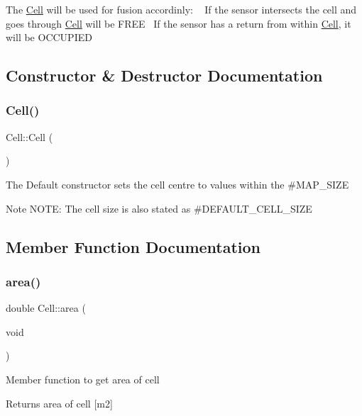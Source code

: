 The \hyperlink{classCell}{Cell} will be used for fusion accordinly\+: ~\newline
If the sensor intersects the cell and goes through \hyperlink{classCell}{Cell} will be F\+R\+EE~\newline
If the sensor has a return from within \hyperlink{classCell}{Cell}, it will be O\+C\+C\+U\+P\+I\+ED~\newline
 

\subsection{Constructor \& Destructor Documentation}
\mbox{\label{classCell_a394510643e8664cf12b5efaf5cb99f71}} 
\subsubsection{\texorpdfstring{Cell()}{Cell()}}
{\footnotesize\ttfamily Cell\+::\+Cell (\begin{DoxyParamCaption}{ }\end{DoxyParamCaption})}

The Default constructor sets the cell centre to values within the \#\+M\+A\+P\+\_\+\+S\+I\+ZE~\newline
\begin{DoxyNote}{Note}
N\+O\+TE\+: The cell size is also stated as \#\+D\+E\+F\+A\+U\+L\+T\+\_\+\+C\+E\+L\+L\+\_\+\+S\+I\+ZE 
\end{DoxyNote}


\subsection{Member Function Documentation}
\mbox{\label{classCell_ad4fa31d97490fac2a1d11f3afaea4e67}} 
\subsubsection{\texorpdfstring{area()}{area()}}
{\footnotesize\ttfamily double Cell\+::area (\begin{DoxyParamCaption}\item[{void}]{ }\end{DoxyParamCaption})}

Member function to get area of cell \begin{DoxyReturn}{Returns}
area of cell \mbox{[}m2\mbox{]} 
\end{DoxyReturn}
\mbox{\label{classCell_a1087822ba50d7afea999824cca8cc1f4}} 
